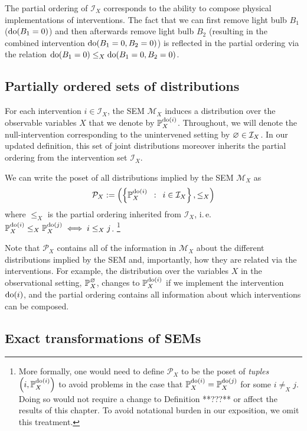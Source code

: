 The partial ordering of $\mathcal{I}_X$ corresponds to the ability to compose physical implementations of interventions. The fact that we can first remove light bulb $B_1$ (${\operatorname{do}(B_1=0)}$) and then afterwards remove light bulb $B_2$ (resulting in the combined intervention ${\operatorname{do}(B_1=0, B_2=0)}$)  is reflected in the partial ordering via the relation ${\operatorname{do}(B_1=0) \leq_X \operatorname{do}(B_1=0,B_2=0)}$.

\subsection{Partially ordered sets of distributions}

For each intervention $i \in \mathcal{I}_X$, the SEM $\mathcal{M}_X$ induces a distribution over the observable variables $X$ that we denote by $\mathbb{P}_X^{\operatorname{do}(i)}$.
Throughout, we will denote the null-intervention corresponding to the unintervened setting by $\varnothing\in \mathcal{I}_X$.
In our updated definition, this set of joint distributions moreover inherits the partial ordering from the intervention set $\mathcal{I}_X$. 

We can write the poset of all distributions implied by the SEM $\mathcal{M}_X$ as
\[\mathcal{P}_X := \left( \left\{ \mathbb{P}_X^{\operatorname{do}(i)} \enspace : \enspace i \in \mathcal{I}_X \right\}, \leq_X \right) \]
where $\leq_X$ is the partial ordering inherited from $\mathcal{I}_X$, i.\,e.\ ${\mathbb{P}_X^{\operatorname{do}(i)} \leq_X \mathbb{P}_X^{\operatorname{do}(j)} \iff i \leq_X j}$.%
\footnote{More formally, one would need to define $\mathcal{P}_X$ to be the poset of \emph{tuples} $\left(i, \mathbb{P}_X^{\operatorname{do}(i)}\right)$ to avoid problems in the case that $\mathbb{P}_X^{\operatorname{do}(i)} = \mathbb{P}_X^{\operatorname{do}(j)}$ for some $i\not=_X j$. Doing so would not require a change to Definition **???** or affect the results of this chapter. To avoid notational burden in our exposition, we omit this treatment.}

Note that $\mathcal{P}_X$ contains all of the information in $\mathcal{M}_X$ about the different distributions implied by the SEM and, importantly, how they are related via the interventions.
For example, the distribution over the variables $X$ in the observational setting, $\mathbb{P}_X^\varnothing$, changes to $\mathbb{P}_X^{\operatorname{do}(i)}$ if we implement the intervention ${\operatorname{do}(i)}$, and the partial ordering contains all information about which interventions can be composed.


\subsection{Exact transformations of SEMs}


